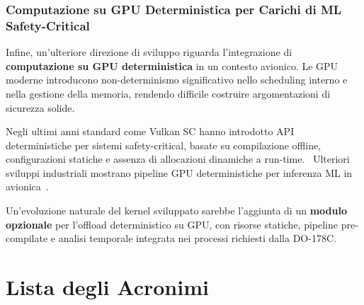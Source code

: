 \documentclass[italian, Lau, oneside]{sapthesis} %
\begin{document}
\subsection*{Computazione su GPU Deterministica per Carichi di ML Safety-Critical}

Infine, un’ulteriore direzione di sviluppo riguarda l’integrazione di \textbf{computazione su GPU deterministica} in un contesto avionico. Le GPU moderne introducono non-determinismo significativo nello scheduling interno e nella gestione della memoria, rendendo difficile costruire argomentazioni di sicurezza solide.~\cite{ref:roy2022,ref:alcaide2023}

Negli ultimi anni standard come Vulkan SC hanno introdotto API deterministiche per sistemi safety-critical, basate su compilazione offline, configurazioni statiche e assenza di allocazioni dinamiche a run-time.~\cite{ref:khronos2022scspec,ref:khronos2022scoverview,ref:nvidia2022,ref:rastergrid2024}  
Ulteriori sviluppi industriali mostrano pipeline GPU deterministiche per inferenza ML in avionica~\cite{ref:coreavi2022,ref:lynx2023}.  

Un’evoluzione naturale del kernel sviluppato sarebbe l’aggiunta di un \textbf{modulo opzionale} per l’offload deterministico su GPU, con risorse statiche, pipeline pre-compilate e analisi temporale integrata nei processi richiesti dalla DO-178C.


\newpage
{}
\chapter*{Lista degli Acronimi}
\end{document}
